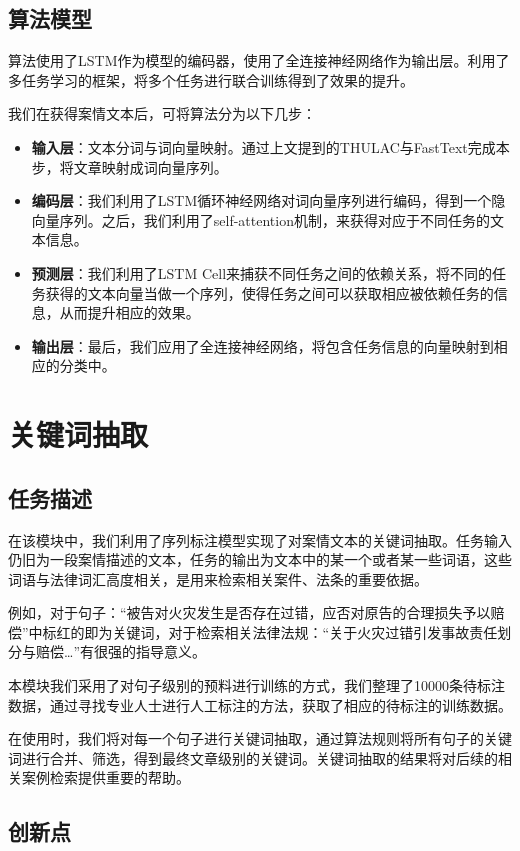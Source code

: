 \subsection{算法模型}
算法使用了LSTM作为模型的编码器，使用了全连接神经网络作为输出层。利用了多任务学习的框架，将多个任务进行联合训练得到了效果的提升。

我们在获得案情文本后，可将算法分为以下几步：
\begin{itemize}
	\item \textbf{输入层}：文本分词与词向量映射。通过上文提到的THULAC与FastText完成本步，将文章映射成词向量序列。
	\item \textbf{编码层}：我们利用了LSTM循环神经网络对词向量序列进行编码，得到一个隐向量序列。之后，我们利用了self-attention机制，来获得对应于不同任务的文本信息。
	\item \textbf{预测层}：我们利用了LSTM Cell来捕获不同任务之间的依赖关系，将不同的任务获得的文本向量当做一个序列，使得任务之间可以获取相应被依赖任务的信息，从而提升相应的效果。
	\item \textbf{输出层}：最后，我们应用了全连接神经网络，将包含任务信息的向量映射到相应的分类中。
\end{itemize}


\section{关键词抽取}
\subsection{任务描述}
在该模块中，我们利用了序列标注模型实现了对案情文本的关键词抽取。任务输入仍旧为一段案情描述的文本，任务的输出为文本中的某一个或者某一些词语，这些词语与法律词汇高度相关，是用来检索相关案件、法条的重要依据。

例如，对于句子：“被告对{\color{red}火灾}发生是否存在{\color{red}过错}，应否对原告的合理损失予以{\color{red}赔偿}”中标红的即为关键词，对于检索相关法律法规：“关于{\color{red}火灾过错}引发事故责任划分与{\color{red}赔偿}…”有很强的指导意义。

本模块我们采用了对句子级别的预料进行训练的方式，我们整理了10000条待标注数据，通过寻找专业人士进行人工标注的方法，获取了相应的待标注的训练数据。

在使用时，我们将对每一个句子进行关键词抽取，通过算法规则将所有句子的关键词进行合并、筛选，得到最终文章级别的关键词。关键词抽取的结果将对后续的相关案例检索提供重要的帮助。

\subsection{创新点}

